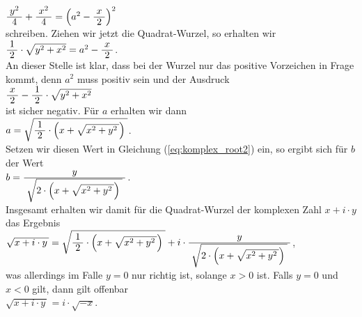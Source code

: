 \hspace*{1.3cm}
$\bruch{y^2}{4} + \bruch{x^2}{4} = \left(a^2 - \bruch{x}{2}\right)^2$
\\[0.2cm]
schreiben.  Ziehen wir jetzt die Quadrat-Wurzel, so erhalten wir
\\[0.2cm]
\hspace*{1.3cm}
$\bruch{1}{2} \cdot \sqrt{y^2 + x^2} = a^2 - \bruch{x}{2}$.
\\[0.2cm]
An dieser Stelle ist klar, dass bei der Wurzel nur das positive Vorzeichen in Frage kommt, denn
$a^2$ muss positiv sein und der Ausdruck
\\[0.2cm]
\hspace*{1.3cm}
$\bruch{x}{2} - \bruch{1}{2} \cdot \sqrt{y^2 + x^2}$
\\[0.2cm]
ist sicher negativ.  F\"{u}r $a$ erhalten wir dann
\\[0.2cm]
\hspace*{1.3cm}
$a = \sqrt{\bruch{1}{2} \cdot \Bigl(x + \sqrt{x^2 + y^2\,}\Bigr)\;}$.
\\[0.2cm]
Setzen wir diesen Wert in Gleichung (\ref{eq:komplex_root2}) ein, so ergibt sich f\"{u}r $b$ der Wert
\\[0.2cm]
\hspace*{1.3cm}
$b = \bruch{y}{\sqrt{2\cdot \Bigl(x + \sqrt{x^2 + y^2\,}\Bigr)\;}}$.
\\[0.2cm]
Insgesamt erhalten wir damit f\"{u}r die Quadrat-Wurzel der komplexen Zahl $x + i \cdot y$ das Ergebnis
\\[0.2cm]
\hspace*{1.3cm}
$\sqrt{x + i \cdot y\,} = \sqrt{\bruch{1}{2} \cdot \Bigl(x + \sqrt{x^2 + y^2\,}\Bigr)\;}
 + i \cdot \bruch{y}{\sqrt{2\cdot \Bigl(x + \sqrt{x^2 + y^2\,}\Bigr)\;}}
$,
\\[0.2cm]
was allerdings im Falle $y = 0$ nur richtig ist, solange $x > 0$ ist.  Falls $y = 0$ und $x < 0$ gilt,
dann gilt offenbar
\\[0.2cm]
\hspace*{1.3cm}
$\sqrt{x + i \cdot y\,} = i \cdot \sqrt{-x}$.


